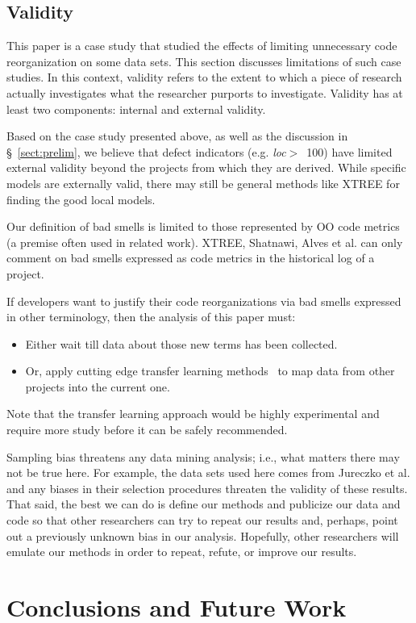 \documentclass[sigconf, proceedings, 9pt]{acmart}
\newcommand{\tion}[1]{\S~\ref{sect:#1}}
\begin{document}
\subsection{Validity}

This paper is a case study that studied the effects of  limiting 
unnecessary code reorganization on some data sets. This section discusses 
limitations of such case studies. In this context, validity refers to the 
extent to which a piece of research actually
investigates what the researcher purports to investigate.
Validity has at least two components: internal and
external validity.


Based on the case study presented above,
as well as the discussion in \tion{prelim},
we believe that defect indicators (e.g. \mbox{{\em loc}$>$ 100})
have limited external validity beyond the projects from which they are 
derived.
While specific models are externally valid,
there may still be general methods like XTREE for finding the good local 
models.

Our definition of bad smells is limited to those represented by OO code 
metrics (a premise often used in related work).
XTREE, Shatnawi, Alves et al. can  only comment
on bad smells   expressed as code metrics
in the historical log of a project.

If developers want to justify their code reorganizations
via bad smells expressed in other terminology,
then the  analysis of this paper must:
\begin{itemize}
	\item Either wait till
	data about those new
	terms has been collected.
	\item Or, apply cutting edge transfer learning
	methods~\cite{Nam15,Jing15, krishna16} to map data from other projects
	into the current one.
\end{itemize}
Note that the transfer learning approach would
be highly experimental and require more study
before it can be safely recommended.

Sampling bias threatens any data mining analysis; i.e., what matters
there may not be true here. For example, the data sets used here comes 
from 
Jureczko et al. and any biases in their selection procedures
threaten the validity of these results.
That said,
the best we can do is define our methods and publicize our data and code so 
that other researchers can
try to repeat our results and, perhaps, point out a previously unknown bias
in our analysis. Hopefully, other researchers will emulate our methods in
order to repeat, refute, or improve our results.


\section{Conclusions and Future Work}
\label{sect:conclusion}


\balance


\end{document}
